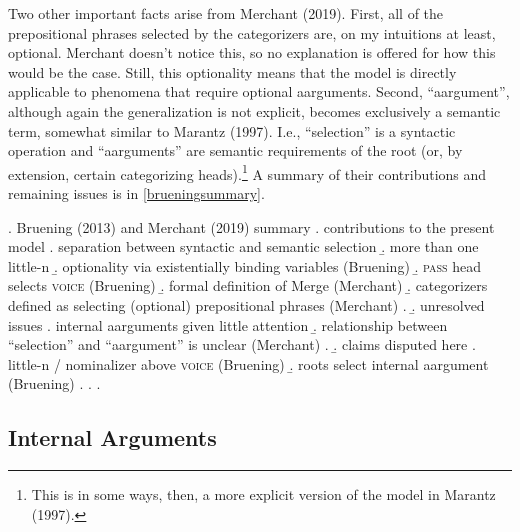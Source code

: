 \documentclass[12pt]{article}
\begin{document}
Two other important facts arise from Merchant (2019). First, all of the prepositional phrases selected by the categorizers are, on my intuitions at least, optional. Merchant doesn't notice this, so no explanation is offered for how this would be the case. Still, this optionality means that the model is directly applicable to phenomena that require optional aarguments. Second, ``aargument'', although again the generalization is not explicit, becomes exclusively a semantic term, somewhat similar to Marantz (1997). I.e., ``selection'' is a syntactic operation and ``aarguments'' are semantic requirements of the root (or, by extension, certain categorizing heads).\footnote{ This is in some ways, then, a more explicit version of the model in Marantz (1997).} A summary of their contributions and remaining issues is in \ref{brueningsummary}.

\singlespacing

\ex. \label{brueningsummary} Bruening (2013) and Merchant (2019) summary
\a. contributions to the present model
\a. separation between syntactic and semantic selection
\b. more than one little-n
\b. optionality via existentially binding variables (Bruening)
\b. \textsc{pass} head selects \textsc{voice} (Bruening)
\b. formal definition of Merge (Merchant)
\b. categorizers defined as selecting (optional) prepositional phrases (Merchant)\footnotemark
\z. 
\b. unresolved issues
\a. internal aarguments given little attention
\b. relationship between ``selection'' and ``aargument'' is unclear (Merchant)
\z. 
\b. claims disputed here
\a. little-n / nominalizer above \textsc{voice} (Bruening)
\b. roots select internal aargument (Bruening)
\z. \z. \z. \par \par 


\doublespacing

\subsection{Internal Arguments}\label{priors3}
\end{document}
